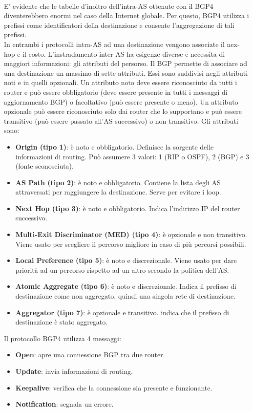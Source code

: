 \documentclass[12pt]{report}
\begin{document}
\vspace{\baselineskip}\\
E' evidente che le tabelle d'inoltro dell'intra-AS ottenute con il BGP4 diventerebbero enormi nel caso della Internet globale. Per questo, BGP4 utilizza i prefissi come identificatori della destinazione e consente l'aggregazione di tali prefissi.
\vspace{\baselineskip}\\
In entrambi i protocolli intra-AS ad una destinazione vengono associate il nex-hop e il costo. L'instradamento inter-AS ha esigenze diverse e necessita di maggiori informazioni: gli attributi del persorso. Il BGP permette di associare ad una destinazione un massimo di sette attributi. Essi sono suddivisi negli attributi noti e in quelli opzionali. Un attributo noto deve essere riconosciuto da tutti i router e può essere obbligatorio (deve essere presente in tutti i messaggi di aggiornamento BGP) o facoltativo (può essere presente o meno). Un attributo opzionale può essere riconosciuto solo dai router che lo supportano e può essere transitivo (può essere passato all'AS successivo) o non transitivo. Gli attributi sono:
\begin{itemize}
	\item \textbf{Origin (tipo 1)}: è noto e obbligatorio. Definisce la sorgente delle informazioni di routing. Può assumere 3 valori: 1 (RIP o OSPF), 2 (BGP) e 3 (fonte sconosciuta).
	\item \textbf{AS Path (tipo 2)}: è noto e obbligatorio. Contiene la lista degli AS attraversati per raggiungere la destinazione. Serve per evitare i loop.
	\item \textbf{Next Hop (tipo 3)}: è noto e obbligatorio. Indica l'indirizzo IP del router successivo.
	\item \textbf{Multi-Exit Discriminator (MED) (tipo 4)}: è opzionale e non transitivo. Viene usato per scegliere il percorso migliore in caso di più percorsi possibili.
	\item \textbf{Local Preference (tipo 5)}: è noto e discrezionale. Viene usato per dare priorità ad un percorso rispetto ad un altro secondo la politica dell'AS.
	\item \textbf{Atomic Aggregate (tipo 6)}: è noto e discrezionale. Indica il prefisso di destinazione come non aggregato, quindi una singola rete di destinazione.
	\item \textbf{Aggregator (tipo 7)}: è opzionale e transitivo. indica che il prefisso di destinazione è stato aggregato.
\end{itemize}
Il protocollo BGP4 utilizza 4 messaggi:
\begin{itemize}
	\item \textbf{Open}: apre una connessione BGP tra due router.
	\item \textbf{Update}: invia informazioni di routing.
	\item \textbf{Keepalive}: verifica che la connessione sia presente e funzionante.
	\item \textbf{Notification}: segnala un errore.
\end{itemize}
\end{document}
